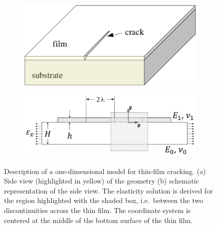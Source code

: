 \begin{figure}
  \centering
  \begin{subfigure}[b]{0.35\textwidth}
    \includegraphics[width=\textwidth,scale=0.5]{Chapter4/figures/1D/side_view.png}
    \caption{}
  \end{subfigure}
  \begin{subfigure}[b]{0.45\textwidth}
    \includegraphics[width=\textwidth,scale=0.5]{Chapter4/figures/1D/1D_schematic.png}
    \caption{}
    \label{fig: Chapter4/1D/schematic}
  \end{subfigure}
  \caption{Description of a one-dimensional model for thin-film cracking.  (a) Side view  (highlighted in yellow) of the geometry (b) schematic representation of the side view. The elasticity solution is derived for the region highlighted with the shaded box, i.e.\ between the two discontinuities across the thin film. The coordinate system is centered at the middle of the bottom surface of the thin film. }
  \label{fig: Chapter4/1D/simplification}
\end{figure}
